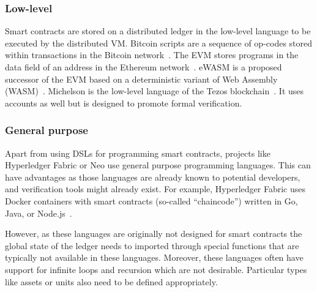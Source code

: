 \subsubsection{Low-level}
Smart contracts are stored on a distributed ledger in the low-level language to be executed by the distributed VM.
Bitcoin scripts are a sequence of op-codes stored within transactions in the Bitcoin network~\cite{BitcoinWiki2018Script}. 
The EVM stores programs in the data field of an address in the Ethereum network~\cite{Wood2014}. 
eWASM is a proposed successor of the EVM based on a deterministic variant of Web Assembly (WASM)~\cite{Wanderer2015,EthereumFoundation2018ewasm}.
Michelson is the low-level language of the Tezos blockchain~\cite{DynamicLedgerSolutions2017}. It uses accounts as well but is designed to promote formal verification.

\subsubsection{General purpose}
Apart from using DSLs for programming smart contracts, projects like Hyperledger Fabric or Neo use general purpose programming languages.
This can have advantages as those languages are already known to potential developers, and verification tools might already exist.
For example, Hyperledger Fabric uses Docker containers with smart contracts (so-called ``chaincode'') written in Go, Java, or Node.js~\cite{Cachin2016}. 

However, as these languages are originally not designed for smart contracts the global state of the ledger needs to imported through special functions that are typically not available in these languages.
Moreover, these languages often have support for infinite loops and recursion which are not desirable.
Particular types like assets or units also need to be defined appropriately. 

